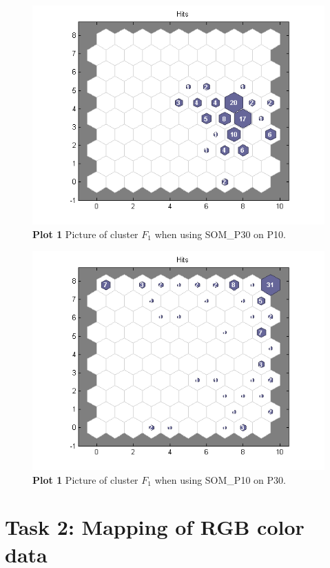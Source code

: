 \documentclass[a4paper]{article}
\begin{document}
\begin{figure}[H] %
	\includegraphics[scale=0.7]{q1_somP30onP10.png}
	\caption{\label{fig:q1_somP30onP10}\textbf{Plot 1} Picture of cluster $F_1$ when using SOM\_P30 on P10.}
\end{figure}
\begin{figure}[H] %
	\includegraphics[scale=0.7]{q1_somP10onP30.png}
	\caption{\label{fig:q1_somP10onP30}\textbf{Plot 1} Picture of cluster $F_1$ when using SOM\_P10 on P30.}
\end{figure}

\section*{Task 2: Mapping of RGB color data}
\end{document}
